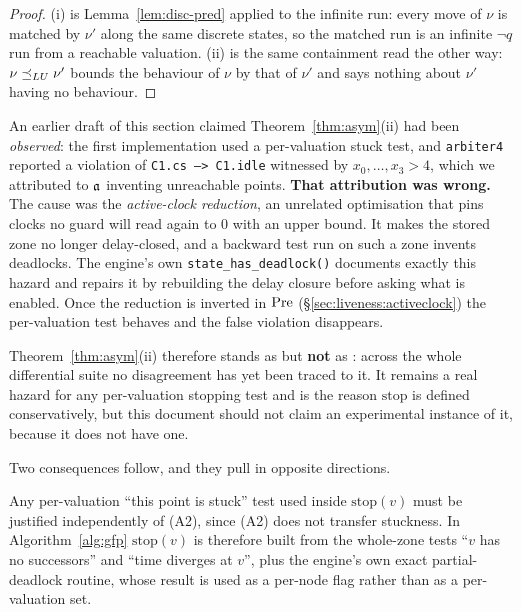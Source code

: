 \begin{proof}
(i) is Lemma~\ref{lem:disc-pred} applied to the infinite run: every move of $\nu$ is matched by
$\nu'$ along the same discrete states, so the matched run is an infinite $\lnot q$ run from a
reachable valuation. (ii) is the same containment read the other way: $\nu \preceq_{LU} \nu'$ bounds the
behaviour of $\nu$ by that of $\nu'$ and says nothing about $\nu'$ having no behaviour.
\end{proof}

\begin{remark}
\label{rem:correction}
An earlier draft of this section claimed Theorem~\ref{thm:asym}(ii) had been \emph{observed}: the
first implementation used a per-valuation stuck test, and \texttt{arbiter4} reported a violation of
\texttt{C1.cs --> C1.idle} witnessed by $x_0,\dots,x_3 > 4$, which we attributed to $\mathfrak{a}$
inventing unreachable points. \textbf{That attribution was wrong.} The cause was the
\emph{active-clock reduction}, an unrelated optimisation that pins clocks no guard will read again
to $0$ with an upper bound. It makes the stored zone no longer delay-closed, and a backward test
run on such a zone invents deadlocks. The engine's own \texttt{state\_has\_deadlock()} documents
exactly this hazard and repairs it by rebuilding the delay closure before asking what is enabled.
Once the reduction is inverted in $\mathrm{Pre}$ (\S\ref{sec:liveness:activeclock}) the per-valuation test
behaves and the false violation disappears.

Theorem~\ref{thm:asym}(ii) therefore stands as \proved{} but \textbf{not} as \measured{}: across the
whole differential suite no disagreement has yet been traced to it. It remains a real hazard for any
per-valuation stopping test and is the reason $\mathrm{stop}$ is defined conservatively, but this
document should not claim an experimental instance of it, because it does not have one.
\end{remark}

Two consequences follow, and they pull in opposite directions.

\begin{corollary}
\label{cor:whole}
Any per-valuation ``this point is stuck'' test used inside $\mathrm{stop}(v)$ must be justified
independently of (A2), since (A2) does not transfer stuckness. In Algorithm~\ref{alg:gfp}
$\mathrm{stop}(v)$ is therefore built from the whole-zone tests ``$v$ has no successors'' and
``time diverges at $v$'', plus the engine's own exact partial-deadlock routine, whose result is
used as a per-node flag rather than as a per-valuation set.
\end{corollary}

